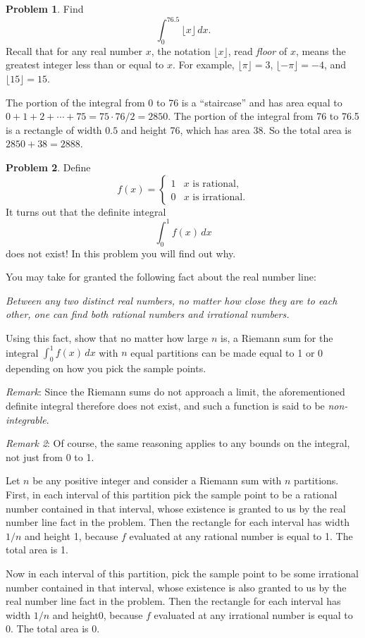\documentclass[11pt,oneside]{amsart}
\theoremstyle{definition}
\newtheorem{problem}{Problem}
\begin{document}
    \begin{problem}
        Find
        \[\int_0^{76.5}\lfloor x\rfloor\,dx.\]
        Recall that for any real number $x$, the notation $\lfloor x\rfloor$, read \emph{floor} of $x$, means the greatest integer less than or equal to $x$. For example, $\lfloor \pi\rfloor=3$, $\lfloor -\pi\rfloor=-4$, and $\lfloor 15\rfloor=15$.
    \end{problem}
    \begin{solution}
        The portion of the integral from 0 to 76 is a ``staircase'' and has area equal to $0+1+2+\cdots+75=75\cdot 76/2=2850$. The portion of the integral from 76 to 76.5 is a rectangle of width $0.5$ and height 76, which has area 38. So the total area is $2850+38=2888$.
    \end{solution}
    
    \begin{problem}
        Define
        \[f(x)=\begin{cases}1 &\text{$x$ is rational},\\0 &\text{$x$ is irrational}.\end{cases}\]
        It turns out that the definite integral
        \[\int_0^1f(x)\,dx\]
        does not exist! In this problem you will find out why.

        You may take for granted the following fact about the real number line:

        \emph{Between any two distinct real numbers, no matter how close they are to each other, one can find both rational numbers and irrational numbers.}

        Using this fact, show that no matter how large $n$ is, a Riemann sum for the integral $\int_0^1 f(x)\,dx$ with $n$ equal partitions can be made equal to 1 or 0 depending on how you pick the sample points.

        \emph{Remark}: Since the Riemann sums do not approach a limit, the aforementioned definite integral therefore does not exist, and such a function is said to be \emph{non-integrable}.

        \emph{Remark 2}: Of course, the same reasoning applies to any bounds on the integral, not just from 0 to 1. 
    \end{problem}
    \begin{solution}
        Let $n$ be any positive integer and consider a Riemann sum with $n$ partitions. First, in each interval of this partition pick the sample point to be a rational number contained in that interval, whose existence is granted to us by the real number line fact in the problem. Then the rectangle for each interval has width $1/n$ and height 1, because $f$ evaluated at any rational number is equal to 1. The total area is 1.

        Now in each interval of this partition, pick the sample point to be some irrational number contained in that interval, whose existence is also granted to us by the real number line fact in the problem. Then the rectangle for each interval has width $1/n$ and height0, because $f$ evaluated at any irrational number is equal to 0. The total area is 0.
    \end{solution}
\end{document}
